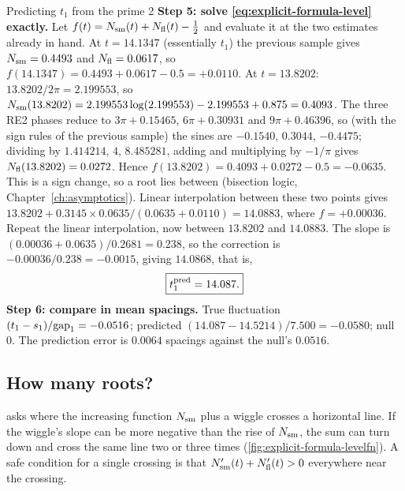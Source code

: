 \begin{sample}{Predicting $t_1$ from the prime 2}
\textbf{Step 5: solve \cref{eq:explicit-formula-level} exactly.} Let $f(t)=N_{\mathrm{sm}}(t)+N_{\mathrm{fl}}(t)-\tfrac12$ and evaluate it at the two estimates already in hand. At $t=14.1347$ (essentially $t_1$) the previous sample gives $N_{\mathrm{sm}}=0.4493$ and $N_{\mathrm{fl}}=0.0617$, so $f(14.1347)=0.4493+0.0617-0.5=+0.0110$. At $t=13.8202$: $13.8202/2\pi=2.199553$, so $N_{\mathrm{sm}}(13.8202)=2.199553\log(2.199553)-2.199553+0.875=0.4093$. The three RE2 phases reduce to $3\pi+0.15465$, $6\pi+0.30931$ and $9\pi+0.46396$, so (with the sign rules of the previous sample) the sines are $-0.1540$, $0.3044$, $-0.4475$; dividing by $1.414214$, $4$, $8.485281$, adding and multiplying by $-1/\pi$ gives $N_{\mathrm{fl}}(13.8202)=0.0272$. Hence $f(13.8202)=0.4093+0.0272-0.5=-0.0635$. This is a sign change, so a root lies between (bisection logic, Chapter~\ref{ch:asymptotics}). Linear interpolation between these two points gives $13.8202+0.3145\times0.0635/(0.0635+0.0110)=14.0883$, where $f=+0.00036$. Repeat the linear interpolation, now between $13.8202$ and $14.0883$. The slope is $(0.00036+0.0635)/0.2681=0.238$, so the correction is $-0.00036/0.238=-0.0015$, giving $14.0868$, that is,
\[
\boxed{t^{\rm pred}_1=14.087.}
\]
\textbf{Step 6: compare in mean spacings.} True fluctuation $(t_1-s_1)/\mathrm{gap}_1=-0.0516$; predicted $(14.087-14.5214)/7.500=-0.0580$; null $0$. The prediction error is $0.0064$ spacings against the null's $0.0516$.
\end{sample}

\subsection{How many roots?}

 asks where the increasing function $N_{\mathrm{sm}}$ plus a wiggle crosses a horizontal line. If the wiggle's slope can be more negative than the rise of $N_{\mathrm{sm}}$, the sum can turn down and cross the same line two or three times (\cref{fig:explicit-formula-levelfn}). A safe condition for a single crossing is that $N_{\mathrm{sm}}'(t)+N_{\mathrm{fl}}'(t)>0$ everywhere near the crossing.

